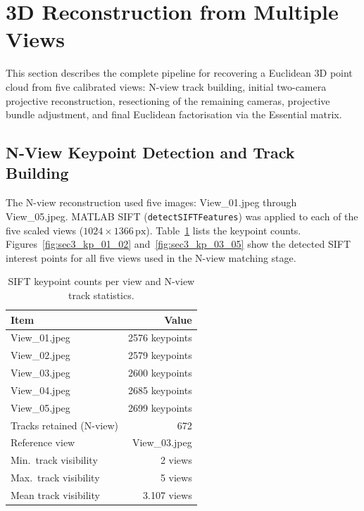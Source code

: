 \documentclass[11pt,a4paper]{article}
\begin{document}
\clearpage

\section{3D Reconstruction from Multiple Views}

This section describes the complete pipeline for recovering a Euclidean 3D point cloud
from five calibrated views: N-view track building, initial two-camera projective
reconstruction, resectioning of the remaining cameras, projective bundle adjustment,
and final Euclidean factorisation via the Essential matrix.

\subsection{N-View Keypoint Detection and Track Building}
\label{sec:sec3_nview}

The N-view reconstruction used five images: View\_01.jpeg through
View\_05.jpeg.  MATLAB SIFT (\texttt{detectSIFTFeatures}) was applied to each
of the five scaled views ($1024 \times 1366\,\mathrm{px}$).
Table~\ref{tab:sec3_keypoints} lists the keypoint counts.  Figures~\ref{fig:sec3_kp_01_02}
and~\ref{fig:sec3_kp_03_05} show the detected SIFT interest points for all five
views used in the N-view matching stage.

\begin{table}[htbp]
\centering
\caption{SIFT keypoint counts per view and N-view track statistics.}
\label{tab:sec3_keypoints}
\begin{tabular}{lr}
\hline
Item & Value \\
\hline
View\_01.jpeg & 2576 keypoints \\
View\_02.jpeg & 2579 keypoints \\
View\_03.jpeg & 2600 keypoints \\
View\_04.jpeg & 2685 keypoints \\
View\_05.jpeg & 2699 keypoints \\
\hline
Tracks retained (N-view) & 672 \\
Reference view          & View\_03.jpeg \\
Min.\ track visibility  & 2 views \\
Max.\ track visibility  & 5 views \\
Mean track visibility   & 3.107 views \\
\hline
\end{tabular}
\end{table}
\end{document}
